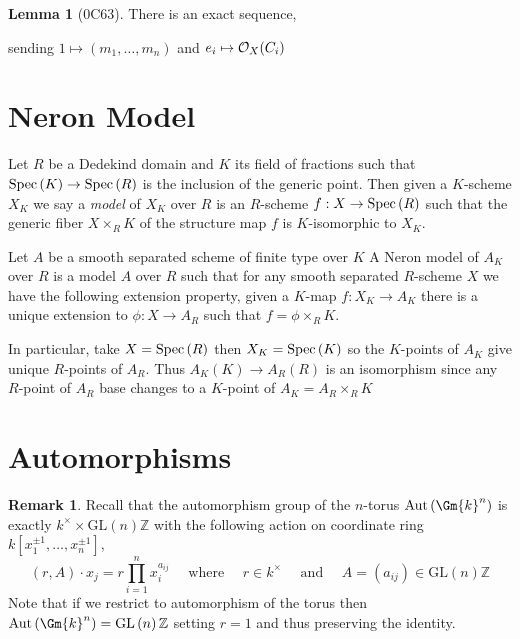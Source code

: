 \documentclass[12pt]{extarticle}
\newcommand{\Z}{\mathbb{Z}}
\theoremstyle{definition}
\newtheorem{lemma}[theorem]{Lemma}
\newtheorem{remark}{Remark}
\newenvironment{definition}[1][Definition:]{\begin{trivlist}
\item[\hskip \labelsep {\bfseries #1}]}{\end{trivlist}}
\newcommand{\GL}[1]{\mathrm{GL}\left(#1\right)}
\newcommand{\Aut}[1]{\mathrm{Aut}\left(#1 \right)}
\begin{document}
\begin{lemma}[0C63]
There is an exact sequence,
\begin{center}
\end{center}
sending $1 \mapsto (m_1, \dots, m_n)$ and $e_i \mapsto \mathcal{O}_{X}(C_i)$ 
\end{lemma}

\section{Neron Model}

\begin{definition}
Let $R$ be a Dedekind domain and $K$ its field of fractions such that $\mathrm{Spec}\left(K\right) \to \mathrm{Spec}\left(R\right)$ is the inclusion of the generic point. Then given a $K$-scheme $X_K$ we say a \textit{model} of $X_K$ over $R$ is an $R$-scheme $f : X \to \mathrm{Spec}\left(R\right)$ such that the generic fiber $X \times_R K$ of the structure map $f$ is $K$-isomorphic to $X_K$. 
\end{definition}

\begin{definition}
Let $A$ be a smooth separated scheme of finite type over $K$
A Neron model of $A_K$ over $R$ is a model $A$ over $R$ such that for any smooth separated $R$-scheme $X$ we have the following extension property, given a $K$-map $f : X_K \to A_K$ there is a unique extension to $\phi : X \to A_R$ such that $f = \phi \times_R K$.  
\begin{center}
\end{center}
In particular, take $X = \mathrm{Spec}\left(R\right)$ then $X_K = \mathrm{Spec}\left(K\right)$ so the $K$-points of $A_K$ give unique $R$-points of $A_R$. Thus $A_K(K) \to A_R(R)$ is an isomorphism since any $R$-point of $A_R$ base changes to a $K$-point of $A_K = A_R \times_R K$ 
\end{definition}


\section{Automorphisms}

\begin{remark}
Recall that the automorphism group of the $n$-torus $\Aut{\Gm{k}^n}$ is exactly $k^\times \times \GL{n}{\Z}$ with the following action on coordinate ring $k[x_1^{\pm 1}, \dots, x_n^{\pm 1}]$,
\begin{equation}
(r,  A) \cdot x_j = r \prod_{i = 1}^n x_i^{a_{ij}} \quad \text{ where } \quad r \in k^\times \quad \text{ and } \quad A = (a_{ij}) \in \GL{n}{\Z} 
\end{equation}
Note that if we restrict to automorphism of the torus  then $\Aut{\Gm{k}^n} = \GL{n}{\Z}$ setting $r = 1$ and thus preserving the identity. 
\end{remark}
\end{document}
